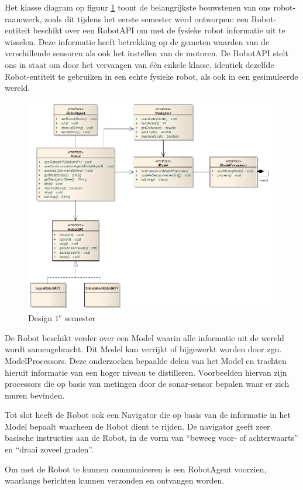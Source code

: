 \documentclass[12pt,a4paper]{report}
\begin{document}
Het klasse diagram op figuur \ref{uml:design-semester1} toont de belangrijkste bouwstenen van ons robot-raamwerk, zoals dit tijdens het eerste semester werd ontworpen: een Robot-entiteit beschikt over een RobotAPI om met de fysieke robot informatie uit te wisselen. Deze informatie heeft betrekking op de gemeten waarden van de verschillende sensoren als ook het instellen van de motoren. De RobotAPI stelt ons in staat om door het vervangen van \'e\'en enkele klasse, identiek dezelfde Robot-entiteit te gebruiken in een echte fysieke robot, als ook in een gesimuleerde wereld.

\begin{figure}[htbp]
  \centering
  \includegraphics[width=110mm]{resources/design-semester1.png}
  \caption{Design $1^e$ semester}
  \label{uml:design-semester1}
\end{figure}

De Robot beschikt verder over een Model waarin alle informatie uit de wereld wordt samengebracht. Dit Model kan verrijkt of bijgewerkt worden door zgn. ModelProcessors. Deze onderzoeken bepaalde delen van het Model en trachten hieruit informatie van een hoger niveau te distilleren. Voorbeelden hiervan zijn processors die op basis van metingen door de sonar-sensor bepalen waar er zich muren bevinden.

Tot slot heeft de Robot ook een Navigator die op basis van de informatie in het Model bepaalt waarheen de Robot dient te rijden. De navigator geeft zeer basische instructies aan de Robot, in de vorm van ``beweeg voor- of achterwaarts'' en ``draai zoveel graden''.

Om met de Robot te kunnen communiceren is een RobotAgent voorzien, waarlangs berichten kunnen verzonden en ontvangen worden.
\end{document}
